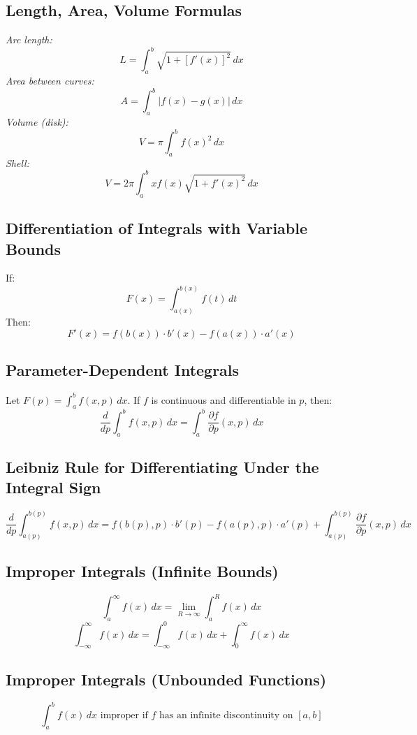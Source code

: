 \subsection{Length, Area, Volume Formulas}

\emph{Arc length:}
\[
L = \int_a^b \sqrt{1 + [f'(x)]^2}\,dx
\]
\emph{Area between curves:}
\[
A = \int_a^b |f(x) - g(x)|\,dx
\]
\emph{Volume (disk):}
\[
V = \pi \int_a^b f(x)^2\,dx
\]
\emph{Shell:}
\[
V = 2\pi \int_a^b x f(x) \sqrt{1 + f'(x)^2}\,dx
\]

\subsection{Differentiation of Integrals with Variable Bounds}

If:
\[
F(x) = \int_{a(x)}^{b(x)} f(t)\,dt
\]
Then:
\[
F'(x) = f(b(x)) \cdot b'(x) - f(a(x)) \cdot a'(x)
\]

\subsection{Parameter-Dependent Integrals}

Let \(F(p) = \int_a^b f(x, p)\,dx\). If \(f\) is continuous and differentiable in \(p\), then:
\[
\frac{d}{dp} \int_a^b f(x, p)\,dx = \int_a^b \frac{\partial f}{\partial p}(x, p)\,dx
\]

\subsection{Leibniz Rule for Differentiating Under the Integral Sign}

\[
\frac{d}{dp} \int_{a(p)}^{b(p)} f(x, p)\,dx = f(b(p), p) \cdot b'(p) - f(a(p), p) \cdot a'(p) + \int_{a(p)}^{b(p)} \frac{\partial f}{\partial p}(x, p)\,dx
\]

\subsection{Improper Integrals (Infinite Bounds)}

\[
\int_a^\infty f(x)\,dx = \lim_{R \to \infty} \int_a^R f(x)\,dx
\]
\[
\int_{-\infty}^\infty f(x)\,dx = \int_{-\infty}^0 f(x)\,dx + \int_0^\infty f(x)\,dx
\]

\subsection{Improper Integrals (Unbounded Functions)}

\[
\int_a^b f(x)\,dx \text{ improper if } f \text{ has an infinite discontinuity on } [a, b]
\]

